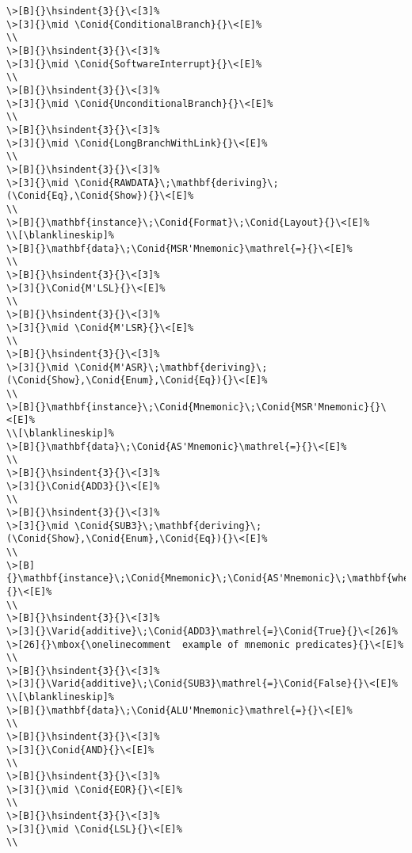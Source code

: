 \documentclass{article}
\newcommand{\Conid}[1]{\mathit{#1}}
\newcommand{\Varid}[1]{\mathit{#1}}
\newlength{\blanklineskip}
\newcommand{\hsindent}[1]{\quad}%
\begin{document}
\begin{Verbatim}[fontsize=\scriptsize]
\>[B]{}\hsindent{3}{}\<[3]%
\>[3]{}\mid \Conid{ConditionalBranch}{}\<[E]%
\\
\>[B]{}\hsindent{3}{}\<[3]%
\>[3]{}\mid \Conid{SoftwareInterrupt}{}\<[E]%
\\
\>[B]{}\hsindent{3}{}\<[3]%
\>[3]{}\mid \Conid{UnconditionalBranch}{}\<[E]%
\\
\>[B]{}\hsindent{3}{}\<[3]%
\>[3]{}\mid \Conid{LongBranchWithLink}{}\<[E]%
\\
\>[B]{}\hsindent{3}{}\<[3]%
\>[3]{}\mid \Conid{RAWDATA}\;\mathbf{deriving}\;(\Conid{Eq},\Conid{Show}){}\<[E]%
\\
\>[B]{}\mathbf{instance}\;\Conid{Format}\;\Conid{Layout}{}\<[E]%
\\[\blanklineskip]%
\>[B]{}\mathbf{data}\;\Conid{MSR'Mnemonic}\mathrel{=}{}\<[E]%
\\
\>[B]{}\hsindent{3}{}\<[3]%
\>[3]{}\Conid{M'LSL}{}\<[E]%
\\
\>[B]{}\hsindent{3}{}\<[3]%
\>[3]{}\mid \Conid{M'LSR}{}\<[E]%
\\
\>[B]{}\hsindent{3}{}\<[3]%
\>[3]{}\mid \Conid{M'ASR}\;\mathbf{deriving}\;(\Conid{Show},\Conid{Enum},\Conid{Eq}){}\<[E]%
\\
\>[B]{}\mathbf{instance}\;\Conid{Mnemonic}\;\Conid{MSR'Mnemonic}{}\<[E]%
\\[\blanklineskip]%
\>[B]{}\mathbf{data}\;\Conid{AS'Mnemonic}\mathrel{=}{}\<[E]%
\\
\>[B]{}\hsindent{3}{}\<[3]%
\>[3]{}\Conid{ADD3}{}\<[E]%
\\
\>[B]{}\hsindent{3}{}\<[3]%
\>[3]{}\mid \Conid{SUB3}\;\mathbf{deriving}\;(\Conid{Show},\Conid{Enum},\Conid{Eq}){}\<[E]%
\\
\>[B]{}\mathbf{instance}\;\Conid{Mnemonic}\;\Conid{AS'Mnemonic}\;\mathbf{where}{}\<[E]%
\\
\>[B]{}\hsindent{3}{}\<[3]%
\>[3]{}\Varid{additive}\;\Conid{ADD3}\mathrel{=}\Conid{True}{}\<[26]%
\>[26]{}\mbox{\onelinecomment  example of mnemonic predicates}{}\<[E]%
\\
\>[B]{}\hsindent{3}{}\<[3]%
\>[3]{}\Varid{additive}\;\Conid{SUB3}\mathrel{=}\Conid{False}{}\<[E]%
\\[\blanklineskip]%
\>[B]{}\mathbf{data}\;\Conid{ALU'Mnemonic}\mathrel{=}{}\<[E]%
\\
\>[B]{}\hsindent{3}{}\<[3]%
\>[3]{}\Conid{AND}{}\<[E]%
\\
\>[B]{}\hsindent{3}{}\<[3]%
\>[3]{}\mid \Conid{EOR}{}\<[E]%
\\
\>[B]{}\hsindent{3}{}\<[3]%
\>[3]{}\mid \Conid{LSL}{}\<[E]%
\\

\end{Verbatim}
\end{document}
